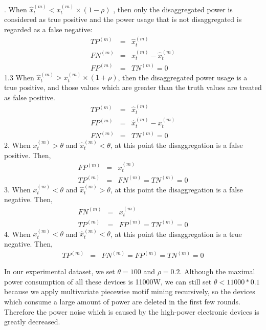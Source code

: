 . When $ \hat{x}_t^{(m)} < x_t^{(m)} \times (1-\rho)$ , then only
the disaggregated power %
is considered as true positive and
the power %
usage that is not disaggregated is regarded as a false negative:
\begin{eqnarray*}
TP^{(m)}&=&\hat{x}_t^{(m)} \\
FN^{(m)}&=&x_t^{(m)} - \hat{x}_t^{(m)} \\
FP^{(m)}&=&TN^{(m)}=0
\end{eqnarray*}
1.3 When $ \hat{x}_t^{(m)}>  x_t^{(m)} \times (1+\rho) $, then
the disaggregated power %
usage is a true positive, and those values
which are greater than the truth values are treated as false positive.
\begin{eqnarray*}
TP^{(m)}&=&\hat{x}_t^{(m)} \\
FP^{(m)}&=&\hat{x}_t^{(m)} - x_t^{(m)} \\
FN^{(m)}&=&TN^{(m)}=0
\end{eqnarray*}
2. When $x_t^{(m)} > \theta$ and  $\hat{x}_t^{(m)}< \theta  $,
at this point the disaggregation is a false positive.  Then,
\begin{eqnarray*}
FP^{(m)}&=&x_t^{(m)} \\
TP^{(m)}&=&FN^{(m)} =TN^{(m)}=0
\end{eqnarray*}
3. When $x_t^{(m)} < \theta$ and  $\hat{x}_t^{(m)} > \theta  $,
at this point the disaggregation is a false negative. Then,
\begin{eqnarray*}
FN^{(m)}&=&x_t^{(m)} \\
TP^{(m)}&=&FP^{(m)} = TN^{(m)}=0
\end{eqnarray*}
4. When $x_t^{(m)} < \theta$ and  $\hat{x}_t^{(m)} < \theta  $,
at this point the disaggregation is a true negative.  Then,
\begin{eqnarray*}
TP^{(m)}&=&FN^{(m)} = FP^{(m)} = TN^{(m)}=0
\end{eqnarray*}

In our experimental dataset, we set
$\theta=100$ and $\rho=0.2$. 
Although the maximal power consumption of all these devices is 11000W, 
we can still set $\theta < 11000 * 0.1$ because we apply multivariate piecewise motif mining recursively, 
so the devices which consume a large amount of power are deleted in the first few rounds. 
Therefore the power noise which is caused by the high-power electronic devices 
is greatly decreased. 

